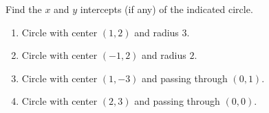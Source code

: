 Find the $x$ and $y$ intercepts (if any) of the indicated circle.
\begin{enumerate}
\item Circle with center $(1,2)$ and radius $3$.
\item Circle with center $(-1,2)$ and radius $2$.
\item Circle with center $ (1,-3)$ and passing through $(0,1)$.
\item Circle with center $ (2, 3)$ and passing through $(0,0)$.
\end{enumerate}